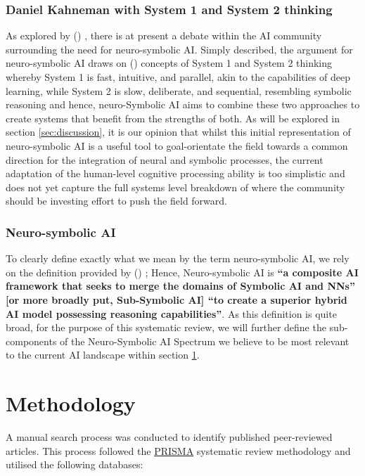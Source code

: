 \documentclass[journal]{IEEEtran}
\newcommand{\citeauthornum}[1]{\citeauthor{#1} (\citeyear{#1}) \cite{#1}}
\begin{document}
\subsubsection{\textbf{Daniel Kahneman with System 1 and System 2 thinking}}
As explored by \citeauthornum{Garcez2023}, there is at present a debate within the AI community surrounding the need for neuro-symbolic AI. Simply described, the argument for neuro-symbolic AI draws on \citeauthornum{Kahneman2011} concepts of System 1 and System 2 thinking whereby System 1 is fast, intuitive, and parallel, akin to the capabilities of deep learning, while System 2 is slow, deliberate, and sequential, resembling symbolic reasoning and hence, neuro-Symbolic AI aims to combine these two approaches to create systems that benefit from the strengths of both. As will be explored in section \ref{sec:discussion}, it is our opinion that whilst this initial representation of neuro-symbolic AI is a useful tool to goal-orientate the field towards a common direction for the integration of neural and symbolic processes, the current adaptation of the human-level cognitive processing ability is too simplistic and does not yet capture the full systems level breakdown of where the community should be investing effort to push the field forward.  

\subsubsection{\textbf{Neuro-symbolic AI}}
To clearly define exactly what we mean by the term neuro-symbolic AI, we rely on the definition provided by \citeauthornum{Garcez2023}; Hence, Neuro-symbolic AI is \textbf{\enquote{a composite AI framework that seeks to merge the domains of Symbolic AI and NNs} [or more broadly put, Sub-Symbolic AI] \enquote{to create a superior hybrid AI model possessing reasoning capabilities}}. As this definition is quite broad, for the purpose of this systematic review, we will further define the sub-components of the Neuro-Symbolic AI Spectrum we believe to be most relevant to the current AI landscape within section \ref{sec:methodology}. 


\section{Methodology}\label{sec:methodology}
A manual search process was conducted to identify published peer-reviewed articles. This process followed the \href{https://www.prisma-statement.org/}{PRISMA} systematic review methodology and utilised the following databases:
\end{document}
